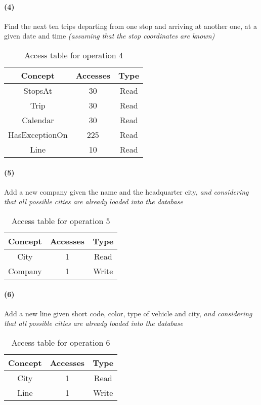 \paragraph{(4)} Find the next ten trips departing from one stop and arriving at another one, at a given date and time \textit{(assuming that the stop coordinates are known)}
\begin{table}[h!]
	\centering
	\begin{tabular}{|c|c|c|}
		\hline
		\textbf{Concept} & \textbf{Accesses} & \textbf{Type} \\
		\hline
		StopsAt & 30 & Read \\ \hline
		Trip & 30 & Read \\ \hline
		Calendar & 30 & Read \\ \hline
		HasExceptionOn & 225 & Read \\ \hline
		Line & 10 & Read \\ \hline
	\end{tabular}
	\caption{Access table for operation 4}\label{tbl:rest.access-4}
\end{table}

\paragraph{(5)} Add a new company given the name and the headquarter city, \textit{and considering that all possible cities are already loaded into the database}

\begin{table}[h]
	\centering
	\begin{tabular}{|c|c|c|}
		\hline
		\textbf{Concept} & \textbf{Accesses} & \textbf{Type} \\
		\hline
		City & 1 & Read \\ \hline
		Company & 1 & Write \\ \hline
	\end{tabular}
	\caption{Access table for operation 5}\label{tbl:rest.access-5}
\end{table}

\paragraph{(6)} Add a new line given short code, color, type of vehicle and city, \textit{and considering that all possible cities are already loaded into the database}

\begin{table}[h]
	\centering
	\begin{tabular}{|c|c|c|}
		\hline
		\textbf{Concept} & \textbf{Accesses} & \textbf{Type} \\
		\hline
		City & 1 & Read \\ \hline
		Line & 1 & Write \\ \hline
	\end{tabular}
	\caption{Access table for operation 6}\label{tbl:rest.access-6}
\end{table}

